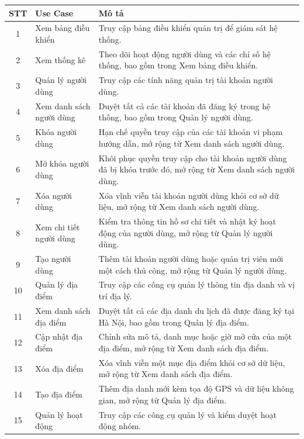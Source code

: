 \documentclass[a4paper,12pt]{report}
\begin{document}
\newpage
\begin{table}[H]
\centering
\small
\renewcommand{\arraystretch}{1.1}
\begin{tabular}{|c|p{4.5cm}|p{9cm}|}
\hline
\textbf{STT} & \textbf{Use Case} & \textbf{Mô tả} \\ \hline
1 & Xem bảng điều khiển & Truy cập bảng điều khiển quản trị để giám sát hệ thống. \\ \hline
2 & Xem thống kê & Theo dõi hoạt động người dùng và các chỉ số hệ thống, bao gồm trong Xem bảng điều khiển. \\ \hline
3 & Quản lý người dùng & Truy cập các tính năng quản trị tài khoản người dùng. \\ \hline
4 & Xem danh sách người dùng & Duyệt tất cả các tài khoản đã đăng ký trong hệ thống, bao gồm trong Quản lý người dùng. \\ \hline
5 & Khóa người dùng & Hạn chế quyền truy cập của các tài khoản vi phạm hướng dẫn, mở rộng từ Xem danh sách người dùng. \\ \hline
6 & Mở khóa người dùng & Khôi phục quyền truy cập cho tài khoản người dùng đã bị khóa trước đó, mở rộng từ Xem danh sách người dùng. \\ \hline
7 & Xóa người dùng & Xóa vĩnh viễn tài khoản người dùng khỏi cơ sở dữ liệu, mở rộng từ Xem danh sách người dùng. \\ \hline
8 & Xem chi tiết người dùng & Kiểm tra thông tin hồ sơ chi tiết và nhật ký hoạt động của người dùng, mở rộng từ Quản lý người dùng. \\ \hline
9 & Tạo người dùng & Thêm tài khoản người dùng hoặc quản trị viên mới một cách thủ công, mở rộng từ Quản lý người dùng. \\ \hline
10 & Quản lý địa điểm & Truy cập các công cụ quản lý thông tin địa danh và vị trí địa lý. \\ \hline
11 & Xem danh sách địa điểm & Duyệt tất cả các địa danh du lịch đã được đăng ký tại Hà Nội, bao gồm trong Quản lý địa điểm. \\ \hline
12 & Cập nhật địa điểm & Chỉnh sửa mô tả, danh mục hoặc giờ mở cửa của một địa điểm, mở rộng từ Xem danh sách địa điểm. \\ \hline
13 & Xóa địa điểm & Xóa vĩnh viễn một mục địa điểm khỏi cơ sở dữ liệu, mở rộng từ Xem danh sách địa điểm. \\ \hline
14 & Tạo địa điểm & Thêm địa danh mới kèm tọa độ GPS và dữ liệu không gian, mở rộng từ Quản lý địa điểm. \\ \hline
15 & Quản lý hoạt động & Truy cập các công cụ quản lý và kiểm duyệt hoạt động nhóm. \\ \hline

\end{tabular}
\end{table}
\end{document}

